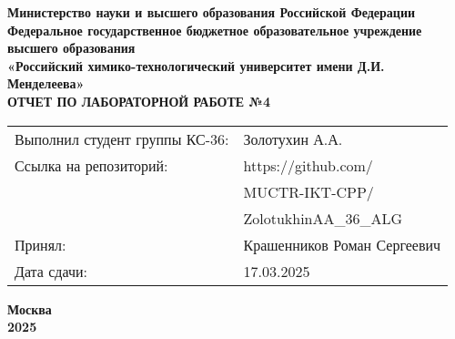 \documentclass[12pt, a4paper]{report}
\begin{document}
	\begin{titlepage}
		\begin{center}
			\large \textbf{Министерство науки и высшего образования Российской Федерации} \\
			\large \textbf{Федеральное государственное бюджетное образовательное учреждение высшего образования} \\
			\large \textbf{«Российский химико-технологический университет имени Д.И. Менделеева»} \\

			\vspace*{4cm}
			\LARGE \textbf{ОТЧЕТ ПО ЛАБОРАТОРНОЙ РАБОТЕ №4}

			\vspace*{4cm}
			\begin{flushright}
				\Large
				\begin{tabular}{>{\raggedleft\arraybackslash}p{9cm} p{10cm}}
					Выполнил студент группы КС-36: & Золотухин А.А. \\
					Ссылка на репозиторий: & https://github.com/ \\
					& MUCTR-IKT-CPP/ \\
					& ZolotukhinAA\_36\_ALG \\
					Принял: & Крашенников Роман Сергеевич \\
					Дата сдачи: & 17.03.2025 \\
				\end{tabular}
			\end{flushright}

			\vspace*{6cm}
			\Large \textbf{Москва \\ 2025}
		\end{center}
	\end{titlepage}

	\tableofcontents
	\thispagestyle{empty}
	\newpage

\end{document}
